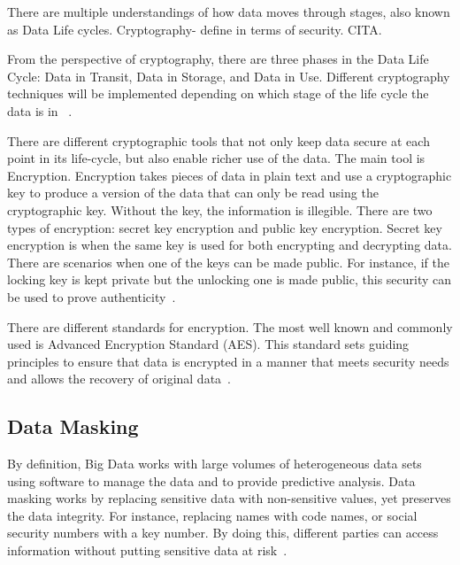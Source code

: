 There are multiple understandings of how data moves through stages,
also known as Data Life cycles. Cryptography- define in terms
of security. CITA.  

From the perspective of cryptography, there are three phases
in the Data Life Cycle: Data in Transit, Data in Storage, 
and Data in Use.  Different cryptography techniques will be
implemented depending on which stage of the life cycle 
the data is in ~\cite{hamlin2016cryptography}.

There are different cryptographic tools that not only keep 
data secure at each point in its life-cycle, but also enable
richer use of the data. The main tool is Encryption.
Encryption takes pieces of data in plain text and use 
a cryptographic key to produce a version of the data that
can only be read using the cryptographic key. Without the
key, the information is illegible. There are two types of 
encryption: secret key encryption and public key encryption. 
Secret key encryption is when the same key is used for both 
encrypting and decrypting data. There are scenarios when one
of the keys can be made public. For instance, if the locking
key is kept private but the unlocking one is made public, 
this security can be used to prove
authenticity~\cite{hamlin2016cryptography}.

There are different standards for encryption. The most well known
and commonly used is Advanced Encryption Standard (AES). 
This standard sets guiding principles to ensure that data is
encrypted in a manner that meets security needs and allows
the recovery of original data~\cite{hamlin2016cryptography}.

\subsection{Data Masking}
By definition, Big Data works with large volumes of heterogeneous
data sets using software to manage the data and to provide
predictive analysis. Data masking works by replacing sensitive 
data with non-sensitive values, yet preserves the data integrity. 
For instance, replacing names with code names, or social security 
numbers with a key number. By doing this, different parties
can access information without putting sensitive data 
at risk~\cite{archana2017big}.

